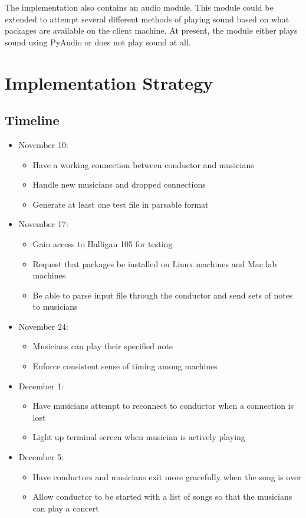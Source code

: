 \documentclass[12pt, letterpaper]{article}
\begin{document}
The implementation also contains an audio module. This module could be extended to attempt several
different methods of playing sound based on what packages are available on the client machine. At
present, the module either plays sound using PyAudio or does not play sound at all.


\section{Implementation Strategy}

\subsection{Timeline}
\begin{itemize}
\item November 10:
    \begin{itemize}
    \item Have a working connection between conductor and musicians
    \item Handle new musicians and dropped connections
    \item Generate at least one test file in parsable format
    \end{itemize}
\item November 17:
    \begin{itemize}
    \item Gain access to Halligan 105 for testing
    \item Request that packages be installed on Linux machines and Mac lab machines
    \item Be able to parse input file through the conductor and send sets of notes to musicians
    \end{itemize}
\item November 24:
    \begin{itemize}
    \item Musicians can play their specified note
    \item Enforce consistent sense of timing among machines
    \end{itemize}
\item December 1:
    \begin{itemize}
    \item Have musicians attempt to reconnect to conductor when a connection is lost
    \item Light up terminal screen when musician is actively playing
    \end{itemize}
\item December 5:
    \begin{itemize}
    \item Have conductors and musicians exit more gracefully when the song is over
    \item Allow conductor to be started with a list of songs so that the musicians can play a
    concert
    \end{itemize}
\end{itemize}
\end{document}
